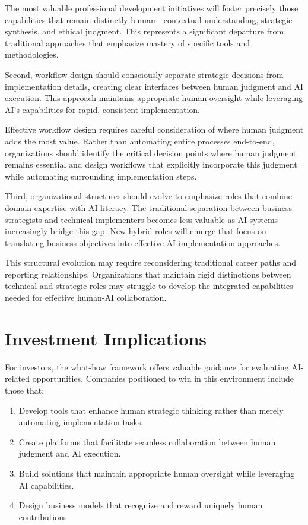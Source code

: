 \documentclass[
  Letterpaper,
]{scrbook}
\providecommand{\tightlist}{%
  \setlength{\itemsep}{0pt}\setlength{\parskip}{0pt}}\usepackage{longtable,booktabs,array}
\begin{document}
The most valuable professional development initiatives will foster
precisely those capabilities that remain distinctly human---contextual
understanding, strategic synthesis, and ethical judgment. This
represents a significant departure from traditional approaches that
emphasize mastery of specific tools and methodologies.

Second, workflow design should consciously separate strategic decisions
from implementation details, creating clear interfaces between human
judgment and AI execution. This approach maintains appropriate human
oversight while leveraging AI's capabilities for rapid, consistent
implementation.

Effective workflow design requires careful consideration of where human
judgment adds the most value. Rather than automating entire processes
end-to-end, organizations should identify the critical decision points
where human judgment remains essential and design workflows that
explicitly incorporate this judgment while automating surrounding
implementation steps.

Third, organizational structures should evolve to emphasize roles that
combine domain expertise with AI
literacy. The traditional separation
between business strategists and technical implementers becomes less
valuable as AI systems increasingly bridge this gap. New hybrid roles
will emerge that focus on translating business objectives into effective
AI implementation approaches.

This structural evolution may require reconsidering traditional career
paths and reporting relationships. Organizations that maintain rigid
distinctions between technical and strategic roles may struggle to
develop the integrated capabilities needed for effective human-AI
collaboration.

\section{Investment Implications}\label{investment-implications-1}

For investors, the what-how framework offers valuable guidance for
evaluating AI-related opportunities. Companies positioned to win in this
environment include those that:

\begin{enumerate}
\def\labelenumi{\arabic{enumi}.}
\tightlist
\item
  Develop tools that enhance human strategic thinking rather than merely
  automating implementation tasks.
\item
  Create platforms that facilitate seamless collaboration between human
  judgment and AI execution.
\item
  Build solutions that maintain appropriate human oversight while
  leveraging AI capabilities.
\item
  Design business models that recognize and reward uniquely human
  contributions
\end{enumerate}
\end{document}
